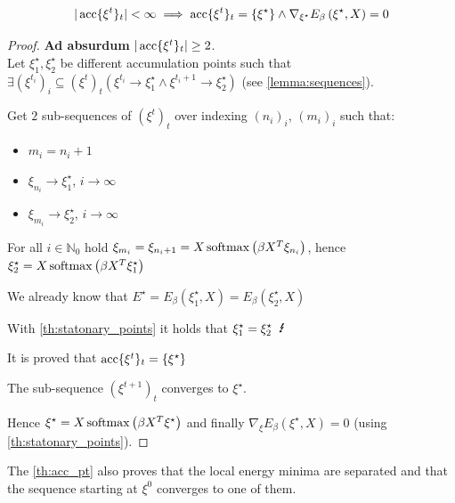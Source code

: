 \begin{theorem} \\
	\label{th:acc_pt}
	\[
	|\operatorname{acc}\{\xi^t\}_t| < \infty \implies \operatorname{acc}\{\xi^t\}_t=\{\xi^\star\} \land \nabla_{\xi^\star}E_{\beta}\left(\xi^\star,X\right) = 0
	\]
	\begin{proof}
		\textbf{Ad absurdum} $|\operatorname{acc}\{\xi^t\}_t| \geq 2$.\\
		\noindent Let $\xi^\star_1, \xi^\star_2$ be different accumulation points such that $\exists \left(\xi^{t_i}\right)_i\subseteq\left(\xi^t\right)_t\left(\xi^{t_i} \to \xi_1^\star \land \xi^{t_i+1} \to \xi_2^\star\right)$ (see \cref{lemma:sequences}).

		\noindent Get $2$ sub-sequences of $\left(\xi^t\right)_t$ over indexing $(n_i)_i$, $(m_i)_i$ such that:
		\begin{itemize}[itemsep=2pt, topsep=10pt]
			\item $m_i = n_i+1$
			\item $\xi_{n_i} \to \xi^\star_1$, $i \to \infty$
			\item $\xi_{m_i} \to \xi^\star_2$, $i \to \infty$
		\end{itemize}
		For all $i\in\mathbb{N}_0$ hold $\xi_{m_i} = \xi_{n_i+1} = X\operatorname{softmax}\left(\beta X^T\xi_{n_i}\right)$, hence $\xi^\star_2 = X\operatorname{softmax}\left(\beta X^T\xi^\star_1\right)$

		\noindent We already know that $E^\star=E_{\beta}\left(\xi^\star_1,X\right) = E_{\beta}\left(\xi^\star_2,X\right)$

		\noindent With \cref{th:statonary_points} it holds that $\xi^\star_1 = \xi^\star_2 \;\;\text{\Lightning}$

		\bigskip\noindent It is proved that ${\operatorname{acc}\{\xi^t\}_t} = \{\xi^\star\}$

		\noindent The sub-sequence $\left(\xi^{t+1}\right)_t$ converges to $\xi^\star$.

		\noindent Hence $\xi^\star = X\operatorname{softmax}\left(\beta X^T\xi^\star\right)$ and finally $\nabla_{\xi}E_{\beta}\left(\xi^\star,X\right) = 0$ (using \cref{th:statonary_points}).
	\end{proof}
\end{theorem}
\begin{corollary}
	The \cref{th:acc_pt} also proves that the local energy minima are separated and that the sequence starting at $\xi^0$ converges to one of them.
\end{corollary}

